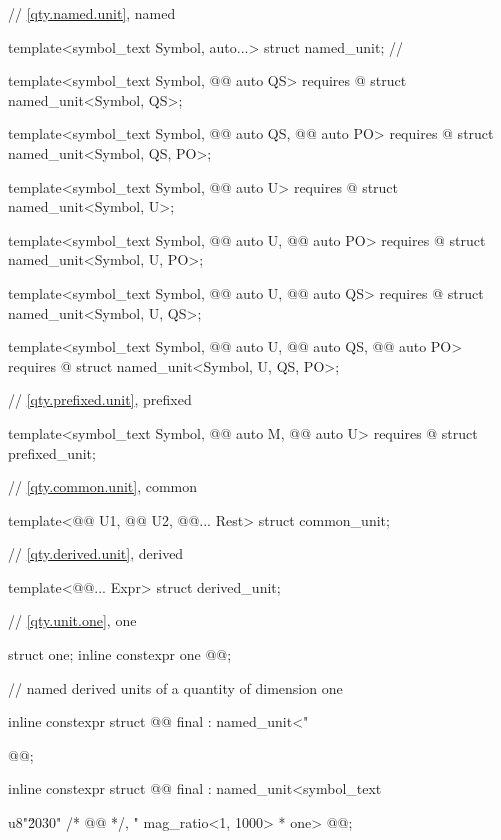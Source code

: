 \begin{codeblock}
{// \ref{qty.named.unit}, named

template<symbol_text Symbol, auto...>
struct named_unit;  // \notdef

template<symbol_text Symbol, @@ auto QS>
  requires @\seebelownc@
struct named_unit<Symbol, QS>;

template<symbol_text Symbol, @@ auto QS, @@ auto PO>
  requires @\seebelownc@
struct named_unit<Symbol, QS, PO>;

template<symbol_text Symbol, @@ auto U>
  requires @\seebelownc@
struct named_unit<Symbol, U>;

template<symbol_text Symbol, @@ auto U, @@ auto PO>
  requires @\seebelownc@
struct named_unit<Symbol, U, PO>;

template<symbol_text Symbol, @@ auto U, @@ auto QS>
  requires @\seebelownc@
struct named_unit<Symbol, U, QS>;

template<symbol_text Symbol, @@ auto U, @@ auto QS,
         @@ auto PO>
  requires @\seebelownc@
struct named_unit<Symbol, U, QS, PO>;

// \ref{qty.prefixed.unit}, prefixed

template<symbol_text Symbol, @@ auto M, @@ auto U>
  requires @\seebelownc@
struct prefixed_unit;

// \ref{qty.common.unit}, common

template<@@ U1, @@ U2, @@... Rest>
struct common_unit;

// \ref{qty.derived.unit}, derived

template<@@... Expr>
struct derived_unit;

// \ref{qty.unit.one}, one

struct one;
inline constexpr one @@{};

// named derived units of a quantity of dimension one

inline constexpr struct @@ final : named_unit<"%
} @@;

inline constexpr struct @@ final :
    named_unit<symbol_text{u8"\u2030" /* @@ */, "%
               mag_ratio<1, 1000> * one> {
} @@;

}
\end{codeblock}
